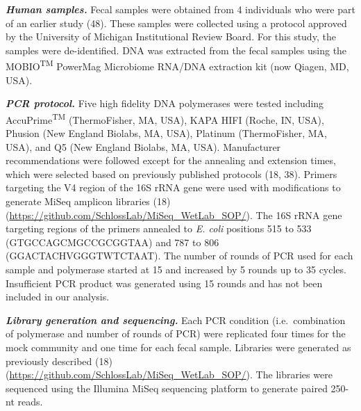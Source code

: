 \documentclass[11pt,]{article}
\begin{document}
\textbf{\emph{Human samples.}} Fecal samples were obtained from 4
individuals who were part of an earlier study (48). These samples were
collected using a protocol approved by the University of Michigan
Institutional Review Board. For this study, the samples were
de-identified. DNA was extracted from the fecal samples using the
MOBIO\textsuperscript{TM} PowerMag Microbiome RNA/DNA extraction kit
(now Qiagen, MD, USA).

\textbf{\emph{PCR protocol.}} Five high fidelity DNA polymerases were
tested including AccuPrime\textsuperscript{TM} (ThermoFisher, MA, USA),
KAPA HIFI (Roche, IN, USA), Phusion (New England Biolabs, MA, USA),
Platinum (ThermoFisher, MA, USA), and Q5 (New England Biolabs, MA, USA).
Manufacturer recommendations were followed except for the annealing and
extension times, which were selected based on previously published
protocols (18, 38). Primers targeting the V4 region of the 16S rRNA gene
were used with modifications to generate MiSeq amplicon libraries (18)
(\url{https://github.com/SchlossLab/MiSeq_WetLab_SOP/}). The 16S rRNA
gene targeting regions of the primers annealed to \emph{E. coli}
positions 515 to 533 (GTGCCAGCMGCCGCGGTAA) and 787 to 806
(GGACTACHVGGGTWTCTAAT). The number of rounds of PCR used for each sample
and polymerase started at 15 and increased by 5 rounds up to 35 cycles.
Insufficient PCR product was generated using 15 rounds and has not been
included in our analysis.

\textbf{\emph{Library generation and sequencing.}} Each PCR condition
(i.e.~combination of polymerase and number of rounds of PCR) were
replicated four times for the mock community and one time for each fecal
sample. Libraries were generated as previously described (18)
(\url{https://github.com/SchlossLab/MiSeq_WetLab_SOP/}). The libraries
were sequenced using the Illumina MiSeq sequencing platform to generate
paired 250-nt reads.
\end{document}
